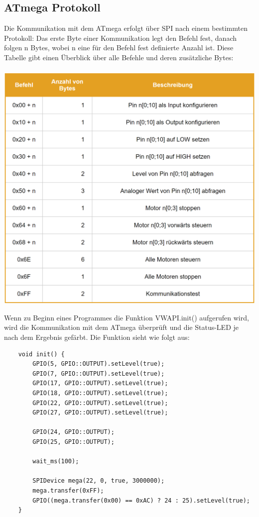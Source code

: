 \documentclass[12pt]{article}
\begin{document}
\subsection{ATmega Protokoll}
Die Kommunikation mit dem ATmega erfolgt über SPI nach einem bestimmten Protokoll: Das erste Byte einer Kommunikation legt den Befehl fest, danach folgen n Bytes, wobei n eine für den Befehl fest definierte Anzahl ist. Diese Tabelle gibt einen Überblick über alle Befehle und deren zusätzliche Bytes:\\\\
\includegraphics[width=\textwidth]{img/commands.PNG}
\begin{center}\end{center}
Wenn zu Beginn eines Programmes die Funktion VWAPI.init() aufgerufen wird, wird die Kommunikation mit dem ATmega überprüft und die Status-LED je nach dem Ergebnis gefärbt. Die Funktion sieht wie folgt aus:
\begin{verbatim}
    void init() {
        GPIO(5, GPIO::OUTPUT).setLevel(true);
        GPIO(7, GPIO::OUTPUT).setLevel(true);
        GPIO(17, GPIO::OUTPUT).setLevel(true);
        GPIO(18, GPIO::OUTPUT).setLevel(true);
        GPIO(22, GPIO::OUTPUT).setLevel(true);
        GPIO(27, GPIO::OUTPUT).setLevel(true);

        GPIO(24, GPIO::OUTPUT);
        GPIO(25, GPIO::OUTPUT);

        wait_ms(100);

        SPIDevice mega(22, 0, true, 3000000);
        mega.transfer(0xFF);
        GPIO((mega.transfer(0x00) == 0xAC) ? 24 : 25).setLevel(true);
    }
\end{verbatim}
\end{document}
